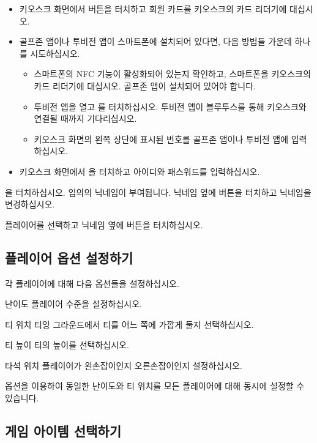 \documentclass[10pt, openright, language=korean]{hzguide}
\begin{document}
\begin{itemize}
\item 키오스크 화면에서  버튼을 터치하고 회원 카드를 키오스크의 카드 리더기에 대십시오.
\item 골프존 앱이나 투비전 앱이 스마트폰에 설치되어 있다면, 다음 방법들 가운데 하나를 시도하십시오.
    \begin{itemize}
    \item 스마트폰의 NFC 기능이 활성화되어 있는지 확인하고, 스마트폰을 키오스크의 카드 리더기에 대십시오. 골프존 앱이 설치되어 있어야 합니다.
    \item 투비전 앱을 열고 를 터치하십시오. 투비전 앱이 블루투스를 통해 키오스크와 연결될 때까지 기다리십시오.
    \item 키오스크 화면의 왼쪽 상단에 표시된 번호를 골프존 앱이나 투비전 앱에 입력하십시오.
    \end{itemize}
\item 키오스크 화면에서 을 터치하고 아이디와 패스워드를 입력하십시오.
\end{itemize}


을 터치하십시오. 임의의 닉네임이 부여됩니다.
닉네임 옆에  버튼을 터치하고 닉네임을 변경하십시오.

플레이어를 선택하고 닉네임 옆에  버튼을 터치하십시오.

\subsection{플레이어 옵션 설정하기}

각 플레이어에 대해 다음 옵션들을 설정하십시오.

\begin{UI}
\item[난이도] 플레이어 수준을 설정하십시오. 
\item[티 위치] 티잉 그라운드에서 티를 어느 쪽에 가깝게 둘지 선택하십시오.
\item[티 높이] 티의 높이를 선택하십시오.
\item[타석 위치] 플레이어가 왼손잡이인지 오른손잡이인지 설정하십시오.
\end{UI}

 옵션을 이용하여 동일한 난이도와 티 위치를 모든 플레이어에 대해 동시에 설정할 수 있습니다. 

\subsection{게임 아이템 선택하기}
\end{document}
